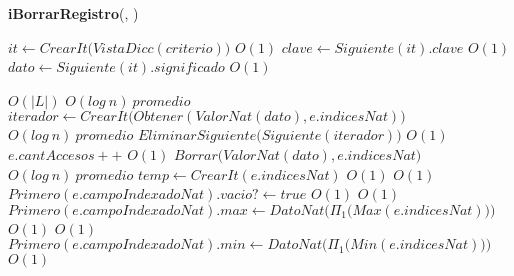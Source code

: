 \begin{Algoritmos}
\begin{algorithm}[H]{\textbf{iBorrarRegistro}(, )}
      \begin{algorithmic}
      \State $it \gets CrearIt\big(VistaDicc(criterio)\big)$    \Comment $O(1)$
      \State $clave \gets Siguiente(it).clave$                  \Comment $O(1)$
      \State $dato \gets Siguiente(it).significado$             \Comment $O(1)$
      \State $ $

       \Comment $O(|L|)$
                         \Comment $O(log\ n) \ promedio$
          \State $iterador \gets CrearIt\big(Obtener(ValorNat(dato), e.indicesNat)\big)$                           \Comment $O(log\ n) \ promedio$
          \State $EliminarSiguiente\big(Siguiente(iterador)\big)$ \Comment $O(1)$
          \State $e.cantAccesos++$                                \Comment $O(1)$
          \State $Borrar\big(ValorNat(dato), e.indicesNat\big)$   \Comment $O(log\ n) \ promedio$
          \State $temp \gets CrearIt(e.indicesNat)$ \Comment $O(1)$
           \Comment $O(1)$
            \State $Primero(e.campoIndexadoNat).vacio? \gets true$ \Comment $O(1)$
          \Else
             \Comment $O(1)$
                \State $Primero(e.campoIndexadoNat).max \gets DatoNat\big(\Pi_1\big(Max(e.indicesNat)\big)\big)$ \Comment $O(1)$
            \EndIf
             \Comment $O(1)$
                \State $Primero(e.campoIndexadoNat).min \gets DatoNat\big(\Pi_1\big(Min(e.indicesNat)\big)\big)$ \Comment $O(1)$
            \EndIf
          \EndIf


\end{algorithmic}
\end{algorithm}
\end{Algoritmos}
